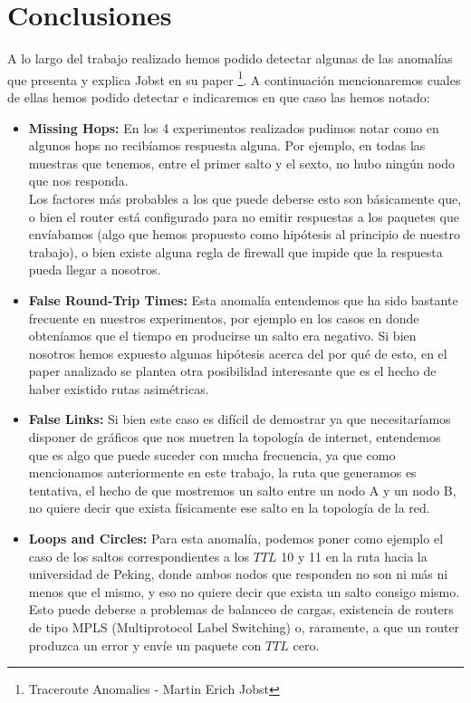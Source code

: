 \section{Conclusiones}


A lo largo del trabajo realizado hemos podido detectar algunas de las anomalías que presenta y explica Jobst en su paper \footnote{Traceroute Anomalies - Martin Erich Jobst}.
A continuación mencionaremos cuales de ellas hemos podido detectar e indicaremos en que caso las hemos notado:

\begin{itemize}
	\item \textbf{Missing Hops:} En los 4 experimentos realizados pudimos notar como en algunos hops no recibíamos respuesta alguna. Por ejemplo, en todas las muestras que tenemos, entre el primer salto y el sexto, no hubo ningún nodo que nos responda. \\
	Los factores más probables a los que puede deberse esto son básicamente que, o bien el router está configurado para no emitir respuestas a los paquetes que envíabamos (algo que hemos propuesto como hipótesis al principio de nuestro trabajo), o bien existe alguna regla de firewall que impide que la respuesta pueda llegar a nosotros.
	
	\item \textbf{False Round-Trip Times:} Esta anomalía entendemos que ha sido bastante frecuente en nuestros experimentos, por ejemplo en los casos en donde obteníamos que el tiempo en producirse un salto era negativo. Si bien nosotros hemos expuesto algunas hipótesis acerca del por qué de esto, en el paper analizado se plantea otra posibilidad interesante que es el hecho de haber existido rutas asimétricas.
	
	\item \textbf{False Links:} Si bien este caso es difícil de demostrar ya que necesitaríamos disponer de gráficos que nos muetren la topología de internet, entendemos que es algo que puede suceder con mucha frecuencia, ya que como mencionamos anteriormente en este trabajo, la ruta que generamos es tentativa, el hecho de que mostremos un salto entre un nodo A y un nodo B, no quiere decir que exista físicamente ese salto en la topología de la red.
	
	\item \textbf{Loops and Circles:}	Para esta anomalía, podemos poner como ejemplo el caso de los saltos correspondientes a los $TTL$ 10 y 11 en la ruta hacia la universidad de Peking, donde ambos nodos que responden no son ni más ni menos que el mismo, y eso no quiere decir que exista un salto consigo mismo. Esto puede deberse a problemas de balanceo de cargas, existencia de routers de tipo MPLS (Multiprotocol Label Switching) o, raramente, a que un router produzca un error y envíe un paquete con $TTL$ cero.
	
\end{itemize}

